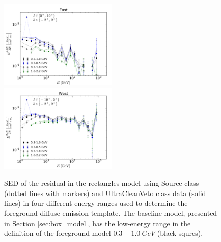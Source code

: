 \begin{figure}[h]
\includegraphics[width=0.5\textwidth]{plots/SED_different_lowE_ranges_boxes_l=5_b=0.pdf}
\includegraphics[width=0.5\textwidth]{plots/SED_different_lowE_ranges_boxes_l=-5_b=0.pdf}
\caption{SED of the residual in the rectangles model using Source class (dotted lines with markers) and UltraCleanVeto class data (solid lines) 
in four different energy ranges used to determine the foreground diffuse emission template. 
The baseline model, presented in Section \ref{sec:box_model}, has the low-energy range in the definition of the foreground model
$0.3 - \SI{1.0}{GeV}$ (black squres).}
\label{fig:syst_models}
\end{figure}

